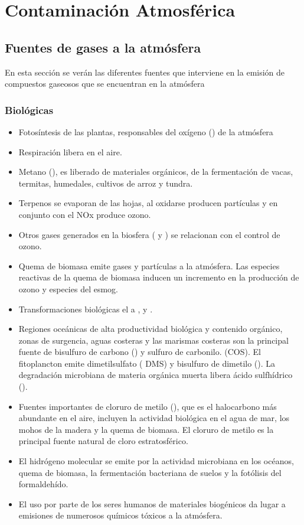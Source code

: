 \chapter{Contaminaci\'on Atmosf\'erica}

\section{Fuentes de gases a la atmósfera}

En esta sección se verán las diferentes fuentes que interviene en la emisión de compuestos gaseosos que se encuentran en la atmósfera

\subsection{Biológicas}\label{subbio}
\begin{itemize}
\item Fotosíntesis de las plantas, responsables del oxígeno () de la atmósfera
\item  Respiración libera  en el aire.
\item  Metano (), es liberado de materiales orgánicos, de la fermentación de vacas, termitas, humedales, cultivos de arroz y tundra.
\item  Terpenos  se evaporan de las hojas, al oxidarse producen partículas y en conjunto con el NOx produce ozono. 
\item Otros gases generados en la biosfera ( y ) se relacionan con el control de ozono.
\item Quema de biomasa emite gases y partículas a la atmósfera. Las especies reactivas de la quema de biomasa inducen un incremento en la producción de ozono y especies del esmog.
\item  Transformaciones biológicas el  a ,  y .
\item Regiones oceánicas de alta productividad biológica y contenido orgánico, zonas de surgencia, aguas costeras y las marismas costeras son la principal fuente de bisulfuro de carbono ()  y sulfuro de carbonilo. (COS). El fitoplancton emite dimetilsulfato ( DMS) y bisulfuro de dimetilo (). La degradación microbiana de materia orgánica muerta libera ácido sulfhídrico ().
\item Fuentes importantes de cloruro de metilo (), que es el halocarbono más abundante en el aire, incluyen la actividad biológica en el agua de mar, los mohos de la madera y la quema de biomasa. El cloruro de metilo es la principal fuente natural de cloro estratosférico.
\item El hidrógeno molecular se emite por la actividad microbiana en los océanos, quema de biomasa, la fermentación bacteriana de suelos y la fotólisis del formaldehído.
\item El uso por parte de los seres humanos de materiales biogénicos da lugar a emisiones de numerosos químicos tóxicos a la atmósfera.
\end{itemize}
